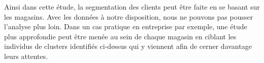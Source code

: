 \documentclass[12pt,a4paper]{book}
\newcommand{\1}{\mathds{1}}
\begin{document}
\noindent
Ainsi dans cette étude, la segmentation des clients peut être faite en se basant sur les magasins. Avec les données à notre disposition, nous ne pouvons pas pousser l'analyse plus loin. Dans un cas pratique en entreprise par exemple, une étude plus approfondie  peut être menée au sein de chaque magasin en ciblant les individus de clusters identifiés ci-dessus qui y viennent afin de cerner davantage leurs attentes.

\vspace{10 mm}




\nocite{XIN2011}
\nocite{OUM2016}
\nocite{FAB2018}

\renewcommand\bibname{Références}


\end{document}
